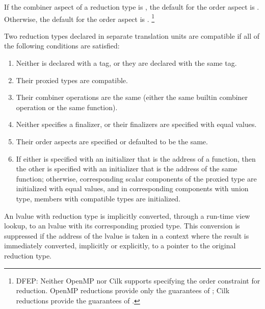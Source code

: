 \pnum
If the combiner aspect of a reduction type is
,
the default for the order aspect is
.
Otherwise, the default for the order aspect is
.%
\footnote{DFEP:
Neither OpenMP nor Cilk supports specifying the order constraint for reduction.
OpenMP reductions provide only the guarantees of
;
Cilk reductions provide the guarantees of
.
}

\pnum
Two reduction types declared in separate translation units
are compatible if all of the following conditions are satisfied:

\begin{enumerate}
\item
Neither is declared with a tag, or they are declared with the same tag.
\item
Their proxied types are compatible.
\item
Their combiner operations are the same
(either the same builtin combiner operation or the same function).
\item
Neither specifies a finalizer,
or their finalizers are specified with equal values.
\item
Their order aspects are specified or defaulted to be the same.
\item
If either is specified with an initializer that is the address of a function,
then the other is specified with an initializer
that is the address of the same function;
otherwise, corresponding scalar components of the proxied type
are initialized with equal values,
and in corresponding components with union type,
members with compatible types are initialized.
\end{enumerate}


\pnum
An lvalue with reduction type is implicitly converted,
through a run-time view lookup,
to an lvalue with its corresponding proxied type.
This conversion is suppressed
if the address of the lvalue is taken in a context
where the result is immediately converted,
implicitly or explicitly,
to a pointer to the original reduction type.

